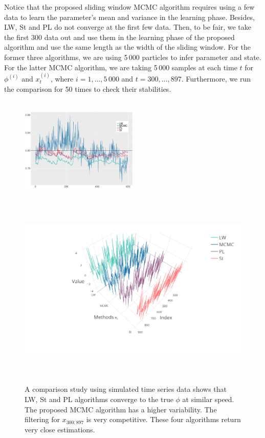 Notice that the proposed sliding window MCMC algorithm requires using a few data to learn the parameter's mean and variance in the learning phase. Besides, LW, St and PL do not converge at the first few data. Then, to be fair, we take the first 300 data out and use them in the learning phase of the proposed algorithm and use the same length as the width of the sliding window. For the former three algorithms, we are using 5\,000 particles to infer parameter and state. For the latter MCMC algorithm, we are taking 5\,000 samples at each time $t$ for $\phi^{(i)}$ and $x_t^{(i)}$, where $i=1,\ldots,5\,000$ and $t=300,\ldots,897$. Furthermore, we run the comparison for 50 times to check their stabilities. 


\begin{figure}[h]
\centering
\includegraphics[width=0.5\textwidth,height=5cm]{Chapters/04Filtering/plot/ggFilterCompPhi2.pdf}
\includegraphics[width=\textwidth,height=9cm]{Chapters/04Filtering/plot/plotlyFilterCompX2.png}
\caption{A comparison study using simulated time series data shows that LW, St and PL algorithms converge to the true $\phi$ at similar speed. The proposed MCMC algorithm has a higher variability. The filtering for $x_{300:897}$ is very competitive. These four algorithms return very close estimations. } \label{FilterRiewComparesion}
\end{figure}

